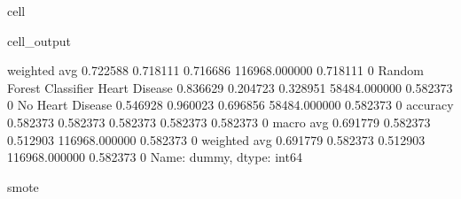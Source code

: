 \documentclass[letterpaper,10pt,english]{jupyterBook}
\begin{document}
\begin{sphinxuseclass}{cell}
\begin{sphinxVerbatimOutput}
\begin{sphinxuseclass}{cell_output}
\begin{sphinxVerbatim}[commandchars=\\\{\}]
                           weighted avg      0.722588   0.718111  0.716686  116968.000000  0.718111    0
Random Forest Classifier   Heart Disease     0.836629   0.204723  0.328951  58484.000000   0.582373    0
                           No Heart Disease  0.546928   0.960023  0.696856  58484.000000   0.582373    0
                           accuracy          0.582373   0.582373  0.582373  0.582373       0.582373    0
                           macro avg         0.691779   0.582373  0.512903  116968.000000  0.582373    0
                           weighted avg      0.691779   0.582373  0.512903  116968.000000  0.582373    0
Name: dummy, dtype: int64

smote
\PYGZhy{}\PYGZhy{}\PYGZhy{}\PYGZhy{}\PYGZhy{}\PYGZhy{}\PYGZhy{}\PYGZhy{}\PYGZhy{}\PYGZhy{}\PYGZhy{}\PYGZhy{}\PYGZhy{}\PYGZhy{}\PYGZhy{}\PYGZhy{}\PYGZhy{}\PYGZhy{}\PYGZhy{}
\end{sphinxVerbatim}

\noindent{}


\end{sphinxuseclass}
\end{sphinxVerbatimOutput}
\end{sphinxuseclass}
\end{document}
